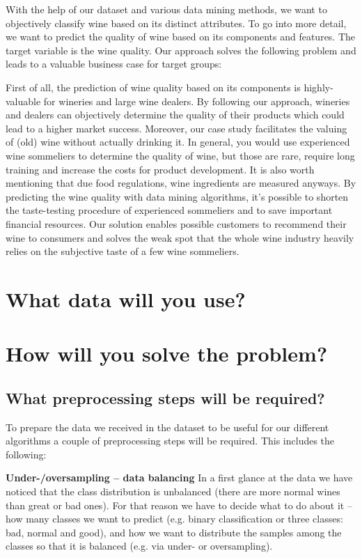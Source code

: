 \documentclass[11pt,titlepage,oneside,openany]{article}
\begin{document}
With the help of our dataset and various data mining methods, we want to objectively classify wine based on its distinct attributes. To go into more detail, we want to predict the quality of wine based on its components and features. The target variable is the wine quality. Our approach solves the following problem and leads to a valuable business case for target groups:

First of all, the prediction of wine quality based on its components is highly-valuable for wineries and large wine dealers. By following our approach, wineries and dealers can objectively determine the quality of their products which could lead to a higher market success. Moreover, our case study facilitates the valuing of (old) wine without actually drinking it. In general, you would use experienced wine sommeliers to determine the quality of wine, but those are rare, require long training and increase the costs for product development. It is also worth mentioning that due food regulations, wine ingredients are measured anyways. By predicting the wine quality with data mining algorithms, it’s possible to shorten the taste-testing procedure of experienced sommeliers and to save important financial resources. Our solution enables possible customers to recommend their wine to consumers and solves the weak spot that the whole wine industry heavily relies on the subjective taste of a few wine sommeliers.

\section{What data will you use?}

\section{How will you solve the problem?}
\subsection{What preprocessing steps will be required?}
To prepare the data we received in the dataset to be useful for our different algorithms a couple of preprocessing
steps will be required. This includes the following:

\textbf{Under-/oversampling -- data balancing} In a first glance at the data we have noticed that the class distribution is
unbalanced (there are more normal wines than great or bad ones). For that reason we have to decide what to do about it -- how many classes we want to predict (e.g. binary classification or three classes: bad, normal and good), and how we want to distribute the samples among the classes so that it is balanced (e.g. via under- or oversampling).
\end{document}
